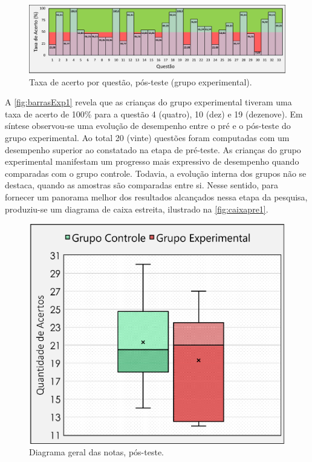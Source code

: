 \begin{figure}[htb]

    \caption{\label{fig:barrasExp1}Taxa de acerto por questão, pós-teste (grupo experimental).}
    \includegraphics[width=\linewidth]{./Visuais/NotasExperimentalPOS.pdf}
  
\end{figure}

A \autoref{fig:barrasExp1} revela que as crianças do grupo experimental tiveram uma taxa de acerto de 100\% para a questão 4 (quatro), 10 (dez) e 19 (dezenove).  Em síntese observou-se uma evolução de desempenho entre o pré e o pós-teste do grupo experimental. Ao total 20 (vinte) questões foram computadas com um desempenho superior ao constatado na etapa de pré-teste.
As crianças do grupo experimental manifestam um progresso mais expressivo de desempenho quando comparadas com o grupo controle. Todavia, a evolução interna dos grupos não se destaca, quando as amostras são comparadas entre si. Nesse sentido, para fornecer um panorama melhor dos resultados alcançados nessa etapa da pesquisa, produziu-se um diagrama de caixa estreita, ilustrado na \autoref{fig:caixapre1}.

\begin{figure}%
    \vspace{-4pt}
    \caption{\label{fig:caixapre1}Diagrama geral das notas, pós-teste.}
    \includegraphics[width=\linewidth]{./Visuais/CaixaEstreitaPOS.pdf}
\end{figure}


